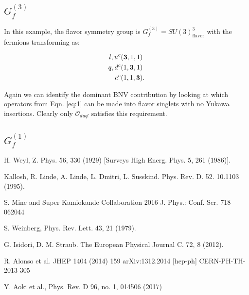 \documentclass[aps,twocolumn,twoside,secnumarabic,balancelastpage,amsmath,amssymb,nofootinbib,hyperref=pdftex]{revtex4}
\begin{document}
\subsection{$G^{(3)}_{f}$}

In this example, the flavor symmetry group is $G^{(3)}_{f} = SU(3)_{\text{flavor}}^{3}$ with the fermions transforming as:

\begin{equation}
 \begin{aligned}
 l, u^{c}&(\bold{3},1,1) \\
 q,d^{c}&(1,\bold{3},1) \\
 e^{c}&(1,1,\bold{3}).
 \end{aligned}
\end{equation}

Again we can identify the dominant BNV contribution by looking at which operators from Eqn. \ref{eq:1} can be made into flavor singlets with no Yukawa insertions. Clearly only $\mathcal{O}_{duql}$ satisfies this requirement.

\subsection{$G^{(1)}_{f}$}

\begin{thebibliography}{9} 

 H. Weyl, Z. Phys. 56, 330 (1929) [Surveys High Energ. Phys. 5, 261 (1986)].

 Kallosh, R. Linde, A. Linde, L. Dmitri, L. Susskind. Phys. Rev. D. 52. 10.1103 (1995).

  S. Mine and Super Kamiokande Collaboration 2016 J. Phys.: Conf. Ser. 718
062044

 S. Weinberg, Phys. Rev. Lett. 43, 21 (1979).

 G. Isidori, D. M. Straub. The European Physical Journal C. 72, 8 (2012).

  R. Alonso et al. JHEP 1404 (2014) 159 arXiv:1312.2014 [hep-ph] CERN-PH-TH-2013-305

 Y. Aoki et al., Phys. Rev. D 96, no. 1, 014506 (2017)

\end{thebibliography}
\end{document}
